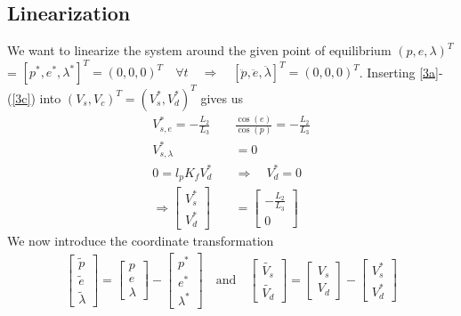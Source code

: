 \subsection{Linearization}
We want to linearize the system around the given point of equilibrium $(p, e, \lambda)^T$ = $[p^*, e^*, \lambda^*]^T = (0, 0, 0)^T \quad \forall t \quad\Rightarrow\quad [\ddot{p},\ddot{e},\ddot{\lambda}]^T = (0,0,0)^T$. Inserting  \cref{3a}-(\ref{3c}) into $(V_s,V_c)^T = (V_s^{*},V_d^{*})^T$ gives us
%
\begin{align*}
    V_{s,e}^* = -\frac{L_2}{L_3}&\frac{\cos(e)}{\cos(p)} = -\frac{L_2}{L_3}\\
    V_{s,\lambda}^* &= 0\\
    0 = l_pK_fV_d^* \quad &\Rightarrow\quad V_d^* = 0\\
    \Rightarrow\begin{bmatrix}V_s^* \\ V_d^*\end{bmatrix} &= \begin{bmatrix}-\frac{L_2}{L_3}\\0\end{bmatrix} 
\end{align*}
%
We now introduce the coordinate transformation
\setcounter{equation}{3}
%
\begin{align*}
    \begin{bmatrix}\widetilde{p}\\\widetilde{e}\\\widetilde{\lambda} \end{bmatrix}
    = \begin{bmatrix}p\\e\\\lambda\end{bmatrix}
    - \begin{bmatrix}p^*\\e^*\\\lambda^*\end{bmatrix}
    \quad\text{and}\quad
    \begin{bmatrix}\tilde{V_s}\\\tilde{V_d} \end{bmatrix}
    = \begin{bmatrix}V_s\\V_d\end{bmatrix}
    - \begin{bmatrix}V_s^*\\V_d^*\end{bmatrix}  %
\end{align*}
